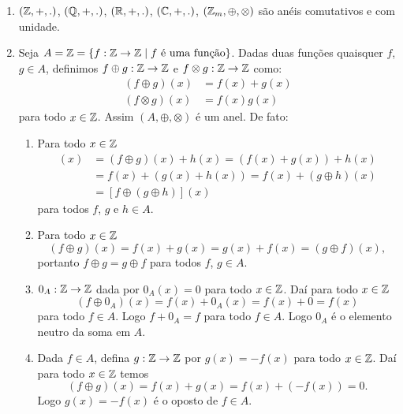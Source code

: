 \begin{exemplos}
    \begin{enumerate}[label={\arabic*})]
        \item $(\mathbb{Z},+,.)$, $(\mathbb{Q},+,.)$, $(\mathbb{R},+,.)$, $(\mathbb{C},+,.)$, $(\mathbb{Z}_m, \oplus, \otimes)$ são anéis comutativos e com unidade.

        \item  Seja $A = \mathbb{Z} =\{f : \mathbb{Z} \to \mathbb{Z} \mid f \mbox{ é uma função}\}$. Dadas duas funções quaisquer $f$, $g \in A$, definimos $f\oplus g:\mathbb{Z} \to \mathbb{Z}$ e
            $f \otimes g:\mathbb{Z} \to \mathbb{Z}$ como:
        \begin{align*}
            (f\oplus g)(x) &= f(x) + g(x)\\
            (f\otimes g)(x) &= f(x)g(x)
        \end{align*}
        para todo $x \in \mathbb{Z}$. Assim $(A, \oplus, \otimes)$ é um anel. De fato:
        \begin{enumerate}[label={\roman*})]
            \item Para todo $x \in \mathbb{Z}$
            \begin{align*}
                [(f \oplus g) \oplus h](x) &= (f \oplus g)(x) + h(x) = (f(x) + g(x)) + h(x)\\
                &= f(x) + (g(x) + h(x)) = f(x) + (g \oplus h)(x)\\ &= [f \oplus (g \oplus h)](x)
            \end{align*}
            para todos $f$, $g$ e $h \in A$.

            \item Para todo $x \in \mathbb{Z}$
            \[
                (f\oplus g)(x) = f(x) + g(x) = g(x) + f(x) = (g\oplus f)(x),
            \]
            portanto $f\oplus g = g\oplus f$ para todos $f$, $g \in A$.

            \item $0_A : \mathbb{Z} \to \mathbb{Z}$ dada por $0_A(x) = 0$ para todo $x \in \mathbb{Z}$. Daí para todo $x \in \mathbb{Z}$
            \[
                (f \oplus 0_A)(x) = f(x) + 0_A(x) = f(x) + 0 = f(x)
            \]
            para todo $f \in A$. Logo $f + 0_A = f$ para todo $f \in A$. Logo $0_A$ é o elemento neutro da soma em $A$.

            \item Dada $f \in A$, defina $g : \mathbb{Z} \to \mathbb{Z}$ por $g(x) = -f(x)$ para todo $x \in \mathbb{Z}$. Daí para todo $x \in \mathbb{Z}$ temos
            \[
                (f \oplus g)(x) = f(x) + g(x) = f(x) + (-f(x)) = 0.
            \]
            Logo $g(x) = -f(x)$ é o oposto de $f \in A$.


\end{enumerate}
\end{enumerate}
\end{exemplos}

